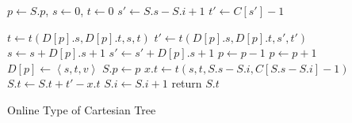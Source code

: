 \begin{algorithm}[!thb]
\SetAlgoNoLine
{}

$p \gets S.p$, $s \gets 0$, $t \gets 0$ \;
$s' \gets S.s - S.{i} + 1$ \;
$t' \gets C[s'] - 1$ \;

 {
  $t \gets t(D[p].s, D[p].t, s, t)$ \;
  $t' \gets t(D[p].s, D[p].t, s', t')$ \;
  $s \gets s + D[p].s+1$ \;
  $s' \gets s' + D[p].s+1$ \;
  $p \gets p - 1$ \;
}
$p \gets p + 1$ \;
$D[p] \gets \left \langle s, t, {v} \right \rangle$ \;
$S.p \gets p$ \;
$x.t \gets t(s, t, S.s-S.i, C[S.s-S.i]-1)$ \;
$S.t \gets S.t + t' - x.t$ \;
$S.i \gets S.i + 1$ \;
return $S.t$ \;

  \caption{Online Type of Cartesian Tree}
  \label{alg:cartesian-encode-online}
\end{algorithm}
